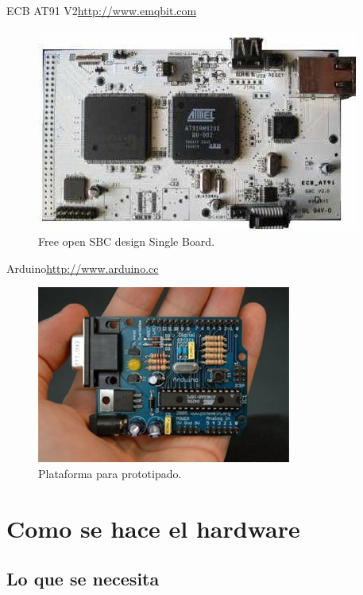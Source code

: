 \documentclass{beamer}
\begin{document}
\begin{frame}{ECB AT91 V2}{\url{http://www.emqbit.com}}
  \begin{figure}
    \includegraphics[scale=0.6]{img/V2}
    \caption{Free open SBC design Single Board.}
    \label{fig:ecb}
  \end{figure}
\end{frame}

\begin{frame}{Arduino}{\url{http://www.arduino.cc}}
  \begin{figure}
    \includegraphics[scale=0.6]{img/arduino316}
    \caption{Plataforma para prototipado.}
    \label{fig:arduino}
  \end{figure}
\end{frame}


\section{Como se hace el hardware}

\subsection{Lo que se necesita}
\end{document}
